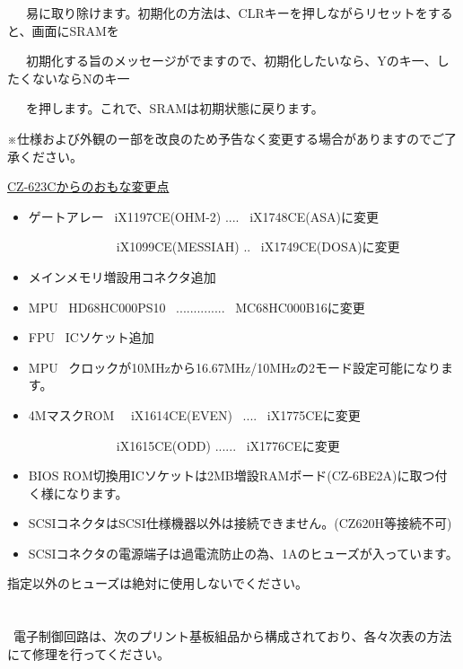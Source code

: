 \documentclass[twoside,a4paper,12pt]{article}
\begin{document}
\ \ \ 易に取り除けます。初期化の方法は、CLRキーを押しながらリセットをすると、画面にSRAMを

\ \ \ 初期化する旨のメッセージがでますので、初期化したいなら、Yのキ一、したくないならNのキ一

\ \ \ を押します。これで、SRAMは初期状態に戻ります。

※仕様および外観のー部を改良のため予告なく変更する場合がありますのでご了承ください。

\newpage

\normalsize\uline{CZ-623Cからのおもな変更点}

\renewcommand{\labelitemi}{\scriptsize●}
\small
\begin{itemize}[leftmargin=25mm, itemsep=-1mm, topsep=1mm]
\item
ゲートアレー \ iX1197CE(OHM-2) .... \ iX1748CE(ASA)に変更

\ \ \ \ \ \ \ \ \ \ \ \ \ \ iX1099CE(MESSIAH) .. \ iX1749CE(DOSA)に変更
\item
メインメモリ増設用コネクタ追加
\item
MPU \ HD68HC000PS10 \ .............. \ MC68HC000B16に変更
\item
FPU \ ICソケット追加
\item
MPU \ クロックが10MHzから16.67MHz/10MHzの2モード設定可能になります。
\item
4MマスクROM \ \ iX1614CE(EVEN) \ .... \ iX1775CEに変更

\ \ \ \ \ \ \ \ \ \ \ \ \ \ iX1615CE(ODD) ...... \ iX1776CEに変更
\item
BIOS ROM切換用ICソケットは2MB増設RAMボード(CZ-6BE2A)に取つ付く様になります。
\item
SCSIコネクタはSCSI仕様機器以外は接続できません。(CZ620H等接続不可)
\item
SCSIコネクタの電源端子は過電流防止の為、1Aのヒューズが入っています。
\end{itemize}

指定以外のヒューズは絶対に使用しないでください。\\\\

\ \\[-3mm]

\scriptsize \ 電子制御回路は、次のプリント基板組品から構成されており、各々次表の方法にて修理を行ってください。\\[-2mm]

\small
\end{document}
